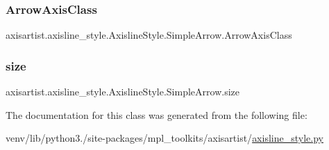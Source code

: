 \subsubsection{\texorpdfstring{Arrow\+Axis\+Class}{ArrowAxisClass}}
{\footnotesize\ttfamily axisartist.\+axisline\+\_\+style.\+Axisline\+Style.\+Simple\+Arrow.\+Arrow\+Axis\+Class\hspace{0.3cm}{\ttfamily [static]}}

\mbox{\label{classaxisartist_1_1axisline__style_1_1AxislineStyle_1_1SimpleArrow_aac53d68a0228e3f14cb44f635ccb8084}} 
\subsubsection{\texorpdfstring{size}{size}}
{\footnotesize\ttfamily axisartist.\+axisline\+\_\+style.\+Axisline\+Style.\+Simple\+Arrow.\+size}



The documentation for this class was generated from the following file\+:\begin{DoxyCompactItemize}
\item 
venv/lib/python3./site-\/packages/mpl\+\_\+toolkits/axisartist/\hyperlink{axisartist_2axisline__style_8py}{axisline\+\_\+style.\+py}\end{DoxyCompactItemize}
